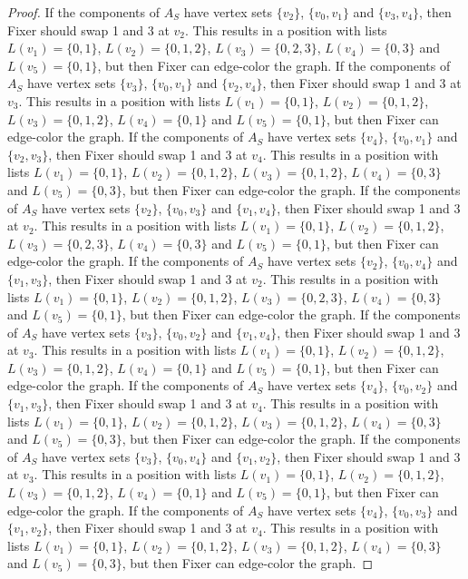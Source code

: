 \documentclass[12pt]{amsart}
\theoremstyle{plain}
\theoremstyle{definition}
\theoremstyle{remark}
\begin{document}
\begin{proof}
If the components of $A_S$ have vertex sets $\{v_2\}$, $\{v_0, v_1\}$ and $\{v_3, v_4\}$, then Fixer should swap 1 and 3 at $v_2$. This results in a position with lists $L(v_1) = \{0, 1\}$, $L(v_2) = \{0, 1, 2\}$, $L(v_3) = \{0, 2, 3\}$, $L(v_4) = \{0, 3\}$ and $L(v_5) = \{0, 1\}$, but then Fixer can edge-color the graph.
If the components of $A_S$ have vertex sets $\{v_3\}$, $\{v_0, v_1\}$ and $\{v_2, v_4\}$, then Fixer should swap 1 and 3 at $v_3$. This results in a position with lists $L(v_1) = \{0, 1\}$, $L(v_2) = \{0, 1, 2\}$, $L(v_3) = \{0, 1, 2\}$, $L(v_4) = \{0, 1\}$ and $L(v_5) = \{0, 1\}$, but then Fixer can edge-color the graph.
If the components of $A_S$ have vertex sets $\{v_4\}$, $\{v_0, v_1\}$ and $\{v_2, v_3\}$, then Fixer should swap 1 and 3 at $v_4$. This results in a position with lists $L(v_1) = \{0, 1\}$, $L(v_2) = \{0, 1, 2\}$, $L(v_3) = \{0, 1, 2\}$, $L(v_4) = \{0, 3\}$ and $L(v_5) = \{0, 3\}$, but then Fixer can edge-color the graph.
If the components of $A_S$ have vertex sets $\{v_2\}$, $\{v_0, v_3\}$ and $\{v_1, v_4\}$, then Fixer should swap 1 and 3 at $v_2$. This results in a position with lists $L(v_1) = \{0, 1\}$, $L(v_2) = \{0, 1, 2\}$, $L(v_3) = \{0, 2, 3\}$, $L(v_4) = \{0, 3\}$ and $L(v_5) = \{0, 1\}$, but then Fixer can edge-color the graph.
If the components of $A_S$ have vertex sets $\{v_2\}$, $\{v_0, v_4\}$ and $\{v_1, v_3\}$, then Fixer should swap 1 and 3 at $v_2$. This results in a position with lists $L(v_1) = \{0, 1\}$, $L(v_2) = \{0, 1, 2\}$, $L(v_3) = \{0, 2, 3\}$, $L(v_4) = \{0, 3\}$ and $L(v_5) = \{0, 1\}$, but then Fixer can edge-color the graph.
If the components of $A_S$ have vertex sets $\{v_3\}$, $\{v_0, v_2\}$ and $\{v_1, v_4\}$, then Fixer should swap 1 and 3 at $v_3$. This results in a position with lists $L(v_1) = \{0, 1\}$, $L(v_2) = \{0, 1, 2\}$, $L(v_3) = \{0, 1, 2\}$, $L(v_4) = \{0, 1\}$ and $L(v_5) = \{0, 1\}$, but then Fixer can edge-color the graph.
If the components of $A_S$ have vertex sets $\{v_4\}$, $\{v_0, v_2\}$ and $\{v_1, v_3\}$, then Fixer should swap 1 and 3 at $v_4$. This results in a position with lists $L(v_1) = \{0, 1\}$, $L(v_2) = \{0, 1, 2\}$, $L(v_3) = \{0, 1, 2\}$, $L(v_4) = \{0, 3\}$ and $L(v_5) = \{0, 3\}$, but then Fixer can edge-color the graph.
If the components of $A_S$ have vertex sets $\{v_3\}$, $\{v_0, v_4\}$ and $\{v_1, v_2\}$, then Fixer should swap 1 and 3 at $v_3$. This results in a position with lists $L(v_1) = \{0, 1\}$, $L(v_2) = \{0, 1, 2\}$, $L(v_3) = \{0, 1, 2\}$, $L(v_4) = \{0, 1\}$ and $L(v_5) = \{0, 1\}$, but then Fixer can edge-color the graph.
If the components of $A_S$ have vertex sets $\{v_4\}$, $\{v_0, v_3\}$ and $\{v_1, v_2\}$, then Fixer should swap 1 and 3 at $v_4$. This results in a position with lists $L(v_1) = \{0, 1\}$, $L(v_2) = \{0, 1, 2\}$, $L(v_3) = \{0, 1, 2\}$, $L(v_4) = \{0, 3\}$ and $L(v_5) = \{0, 3\}$, but then Fixer can edge-color the graph.


\end{proof}
\end{document}
